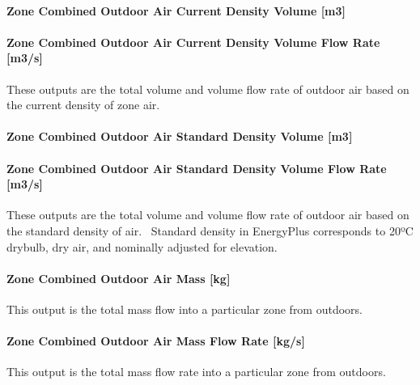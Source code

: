 \paragraph{Zone Combined Outdoor Air Current Density Volume {[}m3{]}}\label{zone-combined-outdoor-air-current-density-volume-m3}

\paragraph{Zone Combined Outdoor Air Current Density Volume Flow Rate {[}m3/s{]}}\label{zone-combined-outdoor-air-current-density-volume-flow-rate-m3s}

These outputs are the total volume and volume flow rate of outdoor air based on the current density of zone air.

\paragraph{Zone Combined Outdoor Air Standard Density Volume {[}m3{]}}\label{zone-combined-outdoor-air-standard-density-volume-m3}

\paragraph{Zone Combined Outdoor Air Standard Density Volume Flow Rate {[}m3/s{]}}\label{zone-combined-outdoor-air-standard-density-volume-flow-rate-m3s}

These outputs are the total volume and volume flow rate of outdoor air based on the standard density of air.~ Standard density in EnergyPlus corresponds to 20ºC drybulb, dry air, and nominally adjusted for elevation.

\paragraph{Zone Combined Outdoor Air Mass {[}kg{]}}\label{zone-combined-outdoor-air-mass-kg}

This output is the total mass flow into a particular zone from outdoors.

\paragraph{Zone Combined Outdoor Air Mass Flow Rate {[}kg/s{]}}\label{zone-combined-outdoor-air-mass-flow-rate-kgs}

This output is the total mass flow rate into a particular zone from outdoors.

